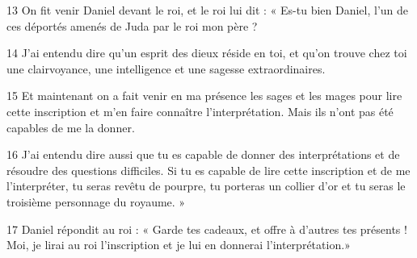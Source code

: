 13 On fit venir Daniel devant le roi, et le roi lui dit : « Es-tu bien Daniel, l’un de ces déportés amenés de Juda par le roi mon père ?

14 J’ai entendu dire qu’un esprit des dieux réside en toi, et qu’on trouve chez toi une clairvoyance, une intelligence et une sagesse extraordinaires.

15 Et maintenant on a fait venir en ma présence les sages et les mages pour lire cette inscription et m’en faire connaître l’interprétation. Mais ils n’ont pas été capables de me la donner.

16 J’ai entendu dire aussi que tu es capable de donner des interprétations et de résoudre des questions difficiles. Si tu es capable de lire cette inscription et de me l’interpréter, tu seras revêtu de pourpre, tu porteras un collier d’or et tu seras le troisième personnage du royaume. »

17 Daniel répondit au roi : « Garde tes cadeaux, et offre à d’autres tes présents ! Moi, je lirai au roi l’inscription et je lui en donnerai l’interprétation.»